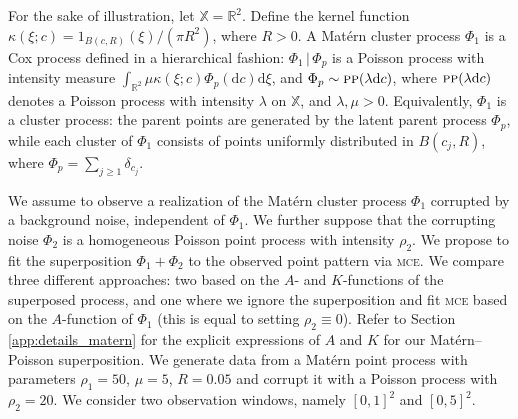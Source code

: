 \documentclass[11pt,a4paper,oneside]{article}
\newcommand{\indicator}{\ensuremath{{1}}}
\newcommand{\dd}{\mathrm d}
\newcommand{\X}{\mathbb{X}}
\newcommand{\R}{\mathbb{R}}
\renewcommand{\mid}{\ensuremath{\,|\,}}
\theoremstyle{definition}
\theoremstyle{remark}
\begin{document}
For the sake of illustration, let $\X= \R^2$. Define the kernel function $\kappa ( \xi ; c ) = \indicator_{B (c, R)} (\xi)/ (\pi R^2)$,
where $R >0$. A Mat\'ern cluster process $\Phi_1$ is a Cox process defined in a  hierarchical fashion:
$\Phi_1 \mid \Phi_p$ is a Poisson process with intensity measure $\int_{\R^2}  \mu  \kappa (\xi ; c) \Phi_p (\dd c) \dd \xi$, and $\Phi_p \sim \textsc{pp} (\lambda \dd c)$, 
where $\textsc{pp} (\lambda \dd c)$ denotes a  Poisson process with intensity $\lambda$ on $\X$, and $\lambda, \mu >0$.
Equivalently, $\Phi_1$ is a cluster process: the parent points are generated by the latent  parent process $\Phi_p$, while each cluster of $\Phi_1$ consists of points uniformly distributed in $B (c_j, R)$, where $\Phi_p= \sum_{j \geq 1} \delta_{c_j}$.


We assume to observe a realization of the Mat\'ern cluster process $\Phi_1$ corrupted by a background noise, independent of $\Phi_1$. We further suppose that the corrupting noise  $\Phi_2$ is a homogeneous Poisson point process with intensity $\rho_2$.
We propose to fit the superposition $\Phi_1 + \Phi_2$ to the observed point pattern via \textsc{mce}. 
We compare three different approaches: two based on the $A$- and $K$-functions of the superposed process, and one where we ignore the superposition and fit \textsc{mce} based on the $A$-function of $\Phi_1$ (this is equal to setting $\rho_2 \equiv 0$). Refer to Section \ref{app:details_matern} for the explicit expressions of $A$ and $K$ for our Mat\'ern--Poisson superposition.
We generate data from a Mat\'ern point process with parameters $\rho_1 = 50$, $\mu=5$, $R = 0.05$ and corrupt it with a Poisson process with $\rho_2 = 20$. We consider two observation windows, namely $[0, 1]^2$ and $ [0, 5]^2$.
\end{document}
